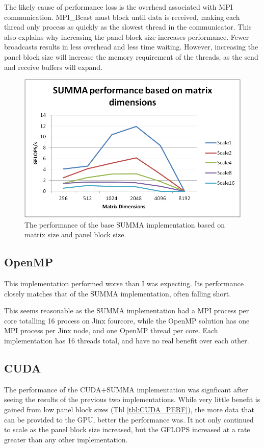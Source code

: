 \documentclass[11pt, twocolumn]{article}
\begin{document}
The likely cause of performance loss is the overhead associated with MPI communication. MPI\_Bcast must block until data is received, making each thread only process as quickly as the slowest thread in the communicator. This also explains why increasing the panel block size increases performance. Fewer broadcasts results in less overhead and less time waiting. However, increasing the panel block size will increase the memory requirement of the threads, as the send and receive buffers will expand.

\begin{figure}[h]
\includegraphics[scale=.3]{Images/SummaPerf.png}
\caption{The performance of the base SUMMA implementation based on matrix size and panel block size.}
\label{fig:SummaPerf}
\end{figure}

\subsection{OpenMP}
This implementation performed worse than I was expecting. Its performance closely matches that of the SUMMA implementation, often falling short.

This seems reasonable as the SUMMA implementation had a MPI process per core totalling 16 process on Jinx fourcore, while the OpenMP solution has one MPI process per Jinx node, and one OpenMP thread per core. Each implementation has 16 threads total, and have no real benefit over each other.

\subsection{CUDA}
The performance of the CUDA+SUMMA implementation was signficant after seeing the results of the previous two implementations. While very little benefit is gained from low panel block sizes (Tbl \ref{tbl:CUDA_PERF}), the more data that can be provided to the GPU, better the performance was. It not only continued to scale as the panel block size increased, but the GFLOPS increased at a rate greater than any other implementation.
\end{document}
